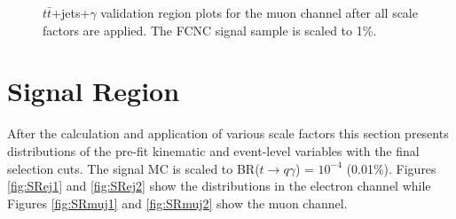 \begin{figure}[h!]
\hfil 
{}
\caption{$t\bar{t}$+jets+$\gamma$ validation region plots for the muon channel after all scale factors are applied.  The FCNC signal sample is scaled to 1\%.} %
\label{fig:VR2muj}
\end{figure}



\section{Signal Region}
\label{sec:SRPlots}
After the calculation and application of various scale factors this section presents distributions of the pre-fit kinematic and event-level variables with the final selection cuts.  The signal MC is scaled to BR($t\rightarrow q\gamma$) = $10^{-4}$ (0.01\%).  Figures \ref{fig:SRej1} and \ref{fig:SRej2} show the distributions in the electron channel while Figures \ref{fig:SRmuj1} and \ref{fig:SRmuj2} show the muon channel.  %


